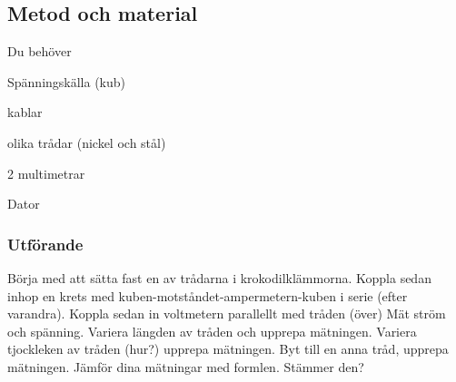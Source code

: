 \documentclass[11pt]{article}
\begin{document}
    \subsection{Metod och material}
    Du behöver
    \begin{enumeration}
        \item Spänningskälla (kub)
        \item kablar
        \item olika trådar (nickel och stål)
        \item 2 multimetrar
        \item Dator
    \end{enumeration}
    \subsubsection{Utförande}
    Börja med att sätta fast en av trådarna i krokodilklämmorna. Koppla sedan inhop en krets med
    kuben-motståndet-ampermetern-kuben i serie (efter varandra). Koppla sedan in voltmetern parallellt med tråden (över)
    Mät ström och spänning. Variera längden av tråden och upprepa mätningen. Variera tjockleken av tråden (hur?) upprepa mätningen.
    Byt till en anna tråd, upprepa mätningen. Jämför dina mätningar med formlen. Stämmer den?
\end{document}
